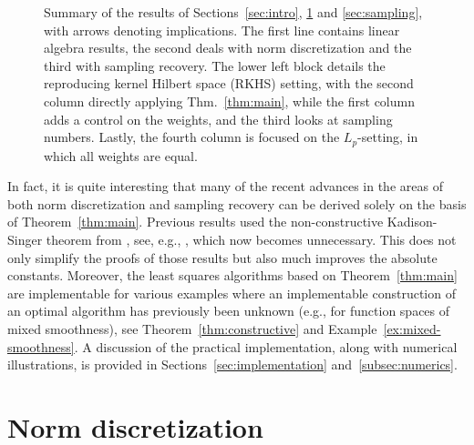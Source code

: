 \documentclass[a4paper,11pt]{article}
\renewcommand{\(}{\left (}
\renewcommand{\)}{\right )}
\newcommand{\<}{\langle}
\renewcommand{\>}{\rangle}
\theoremstyle{definition}
\begin{document}
\begin{figure}[H]
\label{fig:graph-results}
\centering
{}
\caption{Summary of the results of Sections~\ref{sec:intro}, \ref{sec:discretization} and \ref{sec:sampling}, with arrows denoting implications. The first line contains linear algebra results, the second deals with norm discretization and the third with sampling recovery. The lower left block details the reproducing kernel Hilbert space (RKHS) setting, with the second column directly applying Thm.~\ref{thm:main}, while the first column adds a control on the weights, and the third looks at sampling numbers. Lastly, the fourth column is focused on the $L_p$-setting, in which all weights are equal.}
\end{figure}


In fact, it is quite interesting that many of the recent advances in 
the areas of both norm discretization and sampling recovery
can be derived solely on the basis of Theorem~\ref{thm:main}.
Previous results used the non-constructive Kadison-Singer theorem from \cite{MSS},
see, e.g., \cite{CohenDolbeault,DKU,NSU},
which now becomes unnecessary.
This does not only simplify the proofs of those results
but also much improves the absolute constants.
Moreover, the least squares algorithms based on Theorem~\ref{thm:main} 
are implementable for various examples where 
an implementable construction of an optimal algorithm 
has previously been unknown
(e.g., for function spaces of mixed smoothness),
see Theorem~\ref{thm:constructive} and Example~\ref{ex:mixed-smoothness}.
A discussion of the practical implementation, along with numerical illustrations, is provided in Sections~\ref{sec:implementation} and~\ref{subsec:numerics}.


\section{Norm discretization}
\label{sec:discretization}
\end{document}
